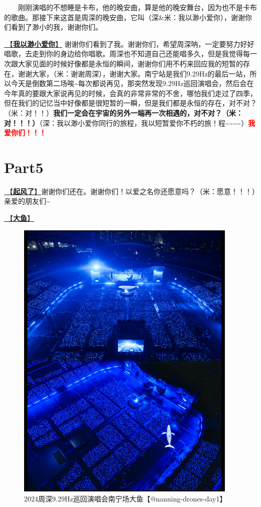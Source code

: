 \documentclass[]{ctexbook}
\begin{document}
  刚刚演唱的不想睡是卡布，他的晚安曲，算是他的晚安舞台，因为也不是卡布的歌曲。那接下来这首是周深的晚安曲，它叫（深\&米：我以渺小爱你），谢谢你们看到了渺小的我，谢谢你们。

\hyperref[loving-you-in-my-humble-way]{🎵【\textbf{我以渺小爱你}】} 谢谢你们看到了我。谢谢你们，希望周深呐，一定要努力好好唱歌，去走到你的身边给你唱歌。周深也不知道自己还能唱多久，但是我觉得每一次跟大家见面的时候好像都是永恒的瞬间，谢谢你们用不朽来回应我的短暂的存在，谢谢大家，（米：谢谢周深），谢谢大家。南宁站是我们9.29Hz的最后一站，所以今天是倒数第二场唉\textasciitilde 每次都说再见，那突然发现9.29Hz巡回演唱会，然后会在今年真的要跟大家说再见的时候，会真的非常非常的不舍，哪怕我们走过了四季，但在我们的记忆当中好像都是很短暂的一瞬，但是我们都是永恒的存在，对不对？（米：对！！）\textbf{我们一定会在宇宙的另外一端再一次相遇的，对不对？（米：对！！！）}（深：我以渺小爱你同行的旅程，我以短暂爱你不朽的旅！程\textasciitilde\textasciitilde\textasciitilde\textasciitilde）\textbf{\textcolor{red}{我爱你们！！！} }

\section{Part5}\label{nanning-20241206-part5}

\hyperref[the-wind-rises]{🎵【\textbf{起风了}】}谢谢你们还在。谢谢你们！以爱之名你还愿意吗？（米：愿意！！！）亲爱的朋友们\textasciitilde{}

\hyperref[big-fish]{🎵【\textbf{大鱼}】}

\begin{figure}

{\centering \includegraphics[width=300pt]{img/nanning20241206/004} 

}

\caption{2024周深9.29Hz巡回演唱会南宁场大鱼【@nanning-drones-day1】}\label{fig:unnamed-chunk-134}
\end{figure}
\end{document}
